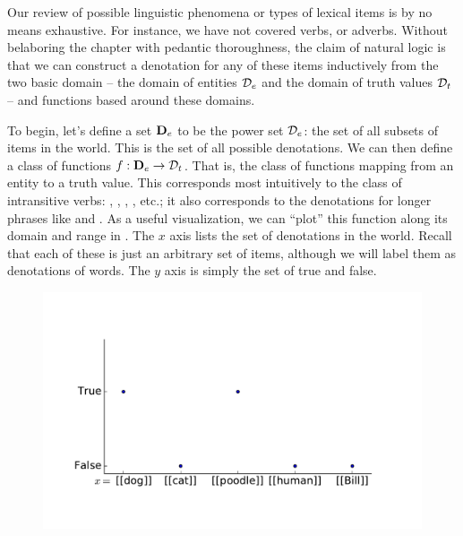 Our review of possible linguistic phenomena or types of lexical items is by 
  no means exhaustive.
For instance, we have not covered verbs, or adverbs.
Without belaboring the chapter with pedantic thoroughness, the claim of natural logic
  is that we can construct a denotation for any of these items inductively
  from the two basic domain -- 
  the domain of entities $\mathcal{D}_e$ and the domain of truth values $\mathcal{D}_t$ --
  and functions based around these domains.

To begin, let's define a set $\mathbf{D}_e$ to be the power set $\mathcal{D}_e$: the set of all subsets
  of items in the world.
This is the set of all possible denotations.
We can then define a class of functions $f : \mathbf{D}_e \rightarrow \mathcal{D}_t$.
That is, the class of functions mapping from an entity to a truth value.
This corresponds most intuitively to the class of intransitive verbs: ,
  , , , etc.;
  it also corresponds to the denotations for longer phrases like 
  and .
As a useful visualization, we can ``plot'' this function
  along its domain and range in  .
The $x$ axis lists the set of denotations in the world.
Recall that each of these is just an arbitrary set of items, 
  although we will label them as denotations of words.
The $y$ axis is simply the set of true and false.

\begin{figure}[h]
\begin{center}
\includegraphics[height=7cm]{img/denotations_barks.pdf}
\end{center}
\end{figure}

